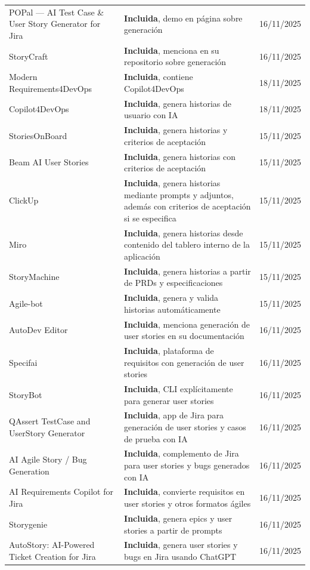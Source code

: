 \begin{center}
\begin{longtable}{|p{7cm}|p{4cm}|p{1.8cm}|}
POPal --- AI Test Case \& User Story Generator for Jira & \textbf{Incluida}, demo en página sobre generación & 16/11/2025 \\
StoryCraft & \textbf{Incluida}, menciona en su repositorio sobre generación & 16/11/2025 \\
Modern Requirements4DevOps & \textbf{Incluida}, contiene Copilot4DevOps & 18/11/2025 \\
Copilot4DevOps & \textbf{Incluida}, genera historias de usuario con IA & 18/11/2025 \\
StoriesOnBoard & \textbf{Incluida}, genera historias y criterios de aceptación & 15/11/2025 \\
Beam AI User Stories & \textbf{Incluida}, genera historias con criterios de aceptación & 15/11/2025 \\
ClickUp & \textbf{Incluida}, genera historias mediante prompts y adjuntos, además con criterios de aceptación si se especifica & 15/11/2025 \\
Miro & \textbf{Incluida}, genera historias desde contenido del tablero interno de la aplicación & 15/11/2025 \\
StoryMachine & \textbf{Incluida}, genera historias a partir de PRDs y especificaciones & 15/11/2025 \\
Agile-bot & \textbf{Incluida}, genera y valida historias automáticamente & 15/11/2025 \\
AutoDev Editor & \textbf{Incluida}, menciona generación de user stories en su documentación & 16/11/2025 \\
Specifai & \textbf{Incluida}, plataforma de requisitos con generación de user stories & 16/11/2025 \\
StoryBot & \textbf{Incluida}, CLI explícitamente para generar user stories & 16/11/2025 \\
QAssert TestCase and UserStory Generator & \textbf{Incluida}, app de Jira para generación de user stories y casos de prueba con IA & 16/11/2025 \\
AI Agile Story / Bug Generation & \textbf{Incluida}, complemento de Jira para user stories y bugs generados con IA & 16/11/2025 \\
AI Requirements Copilot for Jira & \textbf{Incluida}, convierte requisitos en user stories y otros formatos ágiles & 16/11/2025 \\
Storygenie & \textbf{Incluida}, genera epics y user stories a partir de prompts & 16/11/2025 \\
AutoStory: AI-Powered Ticket Creation for Jira & \textbf{Incluida}, genera user stories y bugs en Jira usando ChatGPT & 16/11/2025 \\
\hline
\end{longtable}
\label{table:filtrado2}
\end{center}

